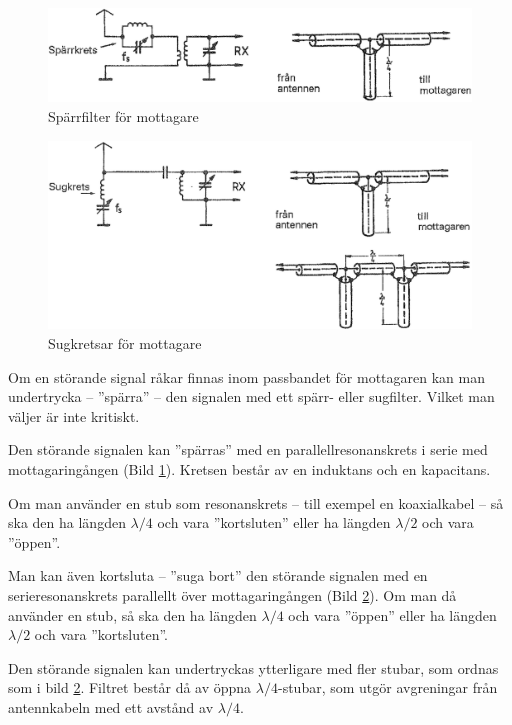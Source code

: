 \begin{figure}
  \includegraphics[width=\textwidth]{images/cropped_pdfs/bild_2_9-05.pdf}
  \caption{Spärrfilter för mottagare}
  \label{fig:bildII9-5}
\end{figure}

\begin{figure}
  \includegraphics[width=\textwidth]{images/cropped_pdfs/bild_2_9-06.pdf}
  \caption{Sugkretsar för mottagare}
  \label{fig:bildII9-6}
\end{figure}

Om en störande signal råkar finnas inom passbandet för mottagaren kan
man undertrycka -- ''spärra'' -- den signalen med ett spärr- eller sugfilter.
Vilket man väljer är inte kritiskt.

Den störande signalen kan ''spärras'' med en parallellresonanskrets i
serie med mottagaringången (Bild \ref{fig:bildII9-5}).
Kretsen består av en induktans och en kapacitans.

Om man använder en stub som resonanskrets -- till exempel en koaxialkabel -- så
ska den ha längden \(\lambda/4\) och vara ''kortsluten'' eller ha
längden \(\lambda/2\) och vara ''öppen''.

Man kan även kortsluta -- ''suga bort'' den störande signalen med en
serieresonanskrets parallellt över mottagaringången (Bild \ref{fig:bildII9-6}).
Om man då använder en stub, så ska den ha längden \(\lambda/4\) och
vara ''öppen'' eller ha längden \(\lambda/2\) och vara ''kortsluten''.

Den störande signalen kan undertryckas ytterligare med fler stubar,
som ordnas som i bild \ref{fig:bildII9-6}.
Filtret består då av öppna \(\lambda/4\)-stubar, som utgör avgreningar från
antennkabeln med ett avstånd av \(\lambda/4\).

